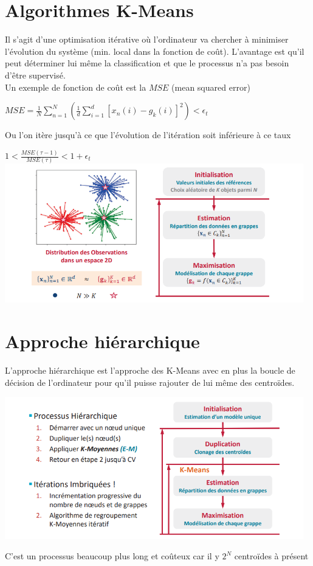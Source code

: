 \documentclass[a4paper,12pt,oneside]{report}	%
\begin{document}
    \section{Algorithmes K-Means}
        Il s'agit d'une optimisation itérative où l'ordinateur va chercher à minimiser l'évolution du système (min. local dans la fonction de coût). L'avantage est qu'il peut déterminer lui même la classification et que le processus n'a pas besoin d'être supervisé.\\
        Un exemple de fonction de coût est la $MSE$ (mean squared error)
        \begin{center}
            $MSE= \frac{1}{N}\sum_{n=1}^N(\frac{1}{d} \sum_{i=1}^d[x_n(i)-g_k(i)]^2)<\epsilon_t$
        \end{center}
        Ou l'on itère jusqu'à ce que l'évolution de l'itération soit inférieure à ce taux
        \begin{center}
            $1<\frac{MSE(\tau-1)}{MSE(\tau)}<1+\epsilon_t$
            \includegraphics[width=13cm]{LaTeX/pictures/2.5_1.png}
        \end{center}
        
    \section{Approche hiérarchique}
        L'approche hiérarchique est l'approche des K-Means avec en plus la boucle de décision de l'ordinateur pour qu'il puisse rajouter de lui même des centroïdes.
        \begin{center}
            \includegraphics[width=13cm]{LaTeX/pictures/2.6_1.png}
        \end{center}
        C'est un processus beaucoup plus long et coûteux car il y $2^N$ centroïdes à présent
\end{document}
